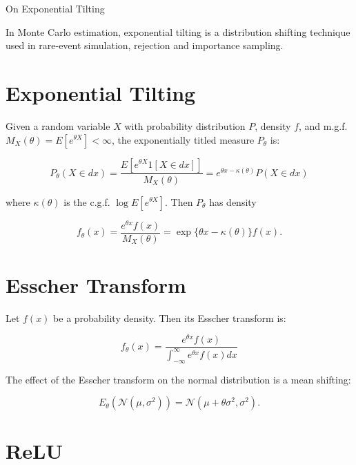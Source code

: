 \documentclass[11pt]{article}
\begin{document}
\begin{center}
{\huge On Exponential Tilting} 
\end{center}

In Monte Carlo estimation, exponential tilting is a distribution shifting technique used in rare-event simulation, rejection and importance sampling.

\section{Exponential Tilting}

Given a random variable $X$ with probability distribution $P$, density $f$, and m.g.f. $M_X(\theta) = E[e^{\theta X}] < \infty$, the exponentially titled measure $P_\theta$ is:

\begin{equation}
P_\theta(X \in dx) = \frac{E[e^{\theta X}1[X\in dx]]}{M_X (\theta)} = e^{\theta x - \kappa(\theta)} P(X \in dx)
\end{equation}

where $\kappa(\theta)$ is the c.g.f. $\log E[e^{\theta X}]$. Then $P_\theta$ has density

\begin{equation}
f_\theta(x) = \frac{e^{\theta x}f(x)}{M_X(\theta)}=\exp\{\theta x - \kappa(\theta) \}f(x).
\end{equation}

\section{Esscher Transform}

Let $f(x)$ be a probability density. Then its Esscher transform is:

\begin{equation}
f_\theta(x) = \frac{ e^{\theta x}f(x) }{ \int_{-\infty}^{\infty} e^{\theta x}f(x)dx }
\end{equation}

The effect of the Esscher transform on the normal distribution is a mean shifting:

\begin{equation}
E_\theta(\mathcal{N}(\mu,\sigma^2)) = \mathcal{N}(\mu+\theta\sigma^2,\sigma^2).
\end{equation}

\section{ReLU}
\end{document}
